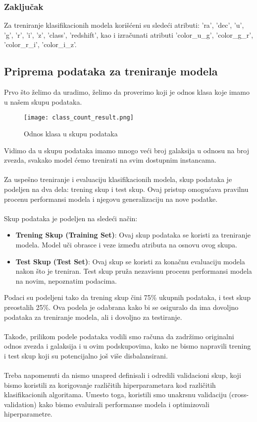 \documentclass[a4paper,12pt]{article}
\begin{document}
\subsubsection{Zaključak}
Za treniranje klasifikacionih modela korišćeni su sledeći atributi: 'ra', 'dec', 'u', 'g', 'r', 'i', 'z', 'class', 'redshift', kao i izračunati atributi 'color\_u\_g', 'color\_g\_r', 'color\_r\_i', 'color\_i\_z'.

\clearpage


\subsection{Priprema podataka za treniranje modela}

Prvo što želimo da uradimo, želimo da proverimo koji je odnos klasa koje imamo u našem skupu podataka.

\begin{figure}[H]
\centering
\texttt{[image: class\_count\_result.png]}
\caption{Odnos klasa u skupu podataka}
\label{fig:sql_query}
\end{figure}

Vidimo da u skupu podataka imamo mnogo veći broj galaksija u odnosu na broj zvezda, svakako model ćemo trenirati na svim dostupnim instancama.
\\\\Za uspešno treniranje i evaluaciju klasifikacionih modela, skup podataka je podeljen na dva dela: trening skup i test skup. Ovaj pristup omogućava pravilnu procenu performansi modela i njegovu generalizaciju na nove podatke.
\\\\Skup podataka je podeljen na sledeći način:
\begin{itemize}
    \item \textbf{Trening Skup (Training Set)}: Ovaj skup podataka se koristi za treniranje modela. Model uči obrasce i veze između atributa na osnovu ovog skupa.
    \item \textbf{Test Skup (Test Set)}: Ovaj skup se koristi za konačnu evaluaciju modela nakon što je treniran. Test skup pruža nezavisnu procenu performansi modela na novim, nepoznatim podacima.
\end{itemize}

Podaci su podeljeni tako da trening skup čini 75\% ukupnih podataka, i test skup preostalih 25\%. Ova podela je odabrana kako bi se osiguralo da ima dovoljno podataka za treniranje modela, ali i dovoljno za testiranje.\\\\
Takođe, prilikom podele podataka vodili smo računa da zadržimo originalni odnos zvezda i galaksija i u ovim podskupovima, kako ne bismo napravili trening i test skup koji su potencijalno još više disbalansirani.\\\\
Treba napomenuti da nismo unapred definisali i odredili validacioni skup, koji bismo koristili za korigovanje različitih hiperparametara kod različitih klasifikacionih algoritama. Umesto toga, koristili smo unakrsnu validaciju (cross-validation) kako bismo evaluirali performanse modela i optimizovali hiperparametre.
\end{document}
